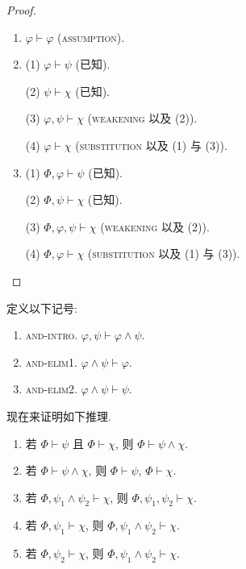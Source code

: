 \begin{proof}
    \begin{enumerate}[itemindent=0ex, itemsep=0pt, label=\upshape{(\alph*)}]
        \item $\varphi\vdash\varphi$ (\textsc{assumption}).
        \item (1) $\varphi\vdash\psi$ (已知). 
        
        (2) $\psi\vdash\chi$ (已知). 
        
        (3) $\varphi, \psi\vdash\chi$ (\textsc{weakening} 以及 (2)). 
        
        (4) $\varphi\vdash\chi$ (\textsc{substitution} 以及 (1) 与 (3)).
        \item (1) $\Phi, \varphi\vdash\psi$ (已知). 
        
        (2) $\Phi, \psi\vdash\chi$ (已知). 
        
        (3) $\Phi, \varphi, \psi\vdash\chi$ (\textsc{weakening} 以及 (2)). 
        
        (4) $\Phi, \varphi\vdash\chi$ (\textsc{substitution} 以及 (1) 与 (3)).
    \end{enumerate}
\end{proof}

\begin{definition}
    定义以下记号: 
    \begin{enumerate}[itemindent=0ex, itemsep=0pt, label=\upshape{(\alph*)}]
        \item \textsc{and-intro}. $\varphi,\psi\vdash\varphi\wedge\psi$. 
        \item \textsc{and-elim1}. $\varphi\wedge\psi\vdash\varphi$.
        \item \textsc{and-elim2}. $\varphi\wedge\psi\vdash\psi$.
    \end{enumerate}
\end{definition}

\begin{example}
    现在来证明如下推理. 
    \begin{enumerate}[itemindent=0ex, itemsep=0pt, label=\upshape{(\alph*)}]
        \item 若 $\Phi\vdash\psi$ 且 $\Phi\vdash\chi$, 则 $\Phi\vdash\psi\wedge\chi$.
        \item 若 $\Phi\vdash\psi\wedge\chi$, 则 $\Phi\vdash\psi$, $\Phi\vdash\chi$.
        \item 若 $\Phi,\psi_1\wedge\psi_2\vdash\chi$, 则 $\Phi,\psi_1,\psi_2\vdash\chi$.
        \item 若 $\Phi, \psi_1\vdash\chi$, 则 $\Phi, \psi_1\wedge\psi_2\vdash\chi$.
        \item 若 $\Phi, \psi_2\vdash\chi$, 则 $\Phi, \psi_1\wedge\psi_2\vdash\chi$.
    \end{enumerate}
\end{example}

